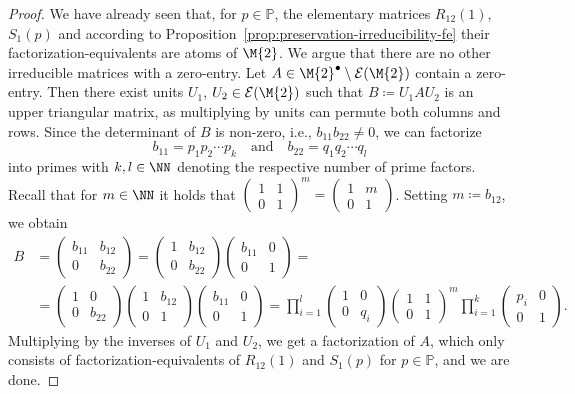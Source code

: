 \begin{proof}
We have already seen that, for $p \in \mathbb{P}$, the elementary matrices $R_{12}(1)$, $S_1(p)$ and according to Proposition~\ref{prop:preservation-irreducibility-fe} their factorization-equivalents are atoms of $\M{2}$. We argue that there are no other irreducible matrices with a zero-entry. Let $A \in {\M{2}}^\bullet\setminus\mathcal{E}(\M{2})$ contain a zero-entry. Then there exist units $U_1$, $U_2 \in \mathcal{E}(\M{2})$ such that $B \coloneqq U_1AU_2$ is an upper triangular matrix, as multiplying by units can permute both columns and rows. Since the determinant of $B$ is non-zero, i.e., $b_{11} b_{22} \neq 0$, we can factorize 
\[ b_{11} = p_1p_2\cdots p_k \quad \text{and} \quad b_{22}=q_1q_2\cdots q_l \]
into primes with $k,l \in \NN$ denoting the respective number of prime factors.  Recall that for $m \in \NN$ it holds that $\begin{pmatrix} 1 & 1 \\ 0 & 1 \end{pmatrix}^m = \begin{pmatrix} 1 & m \\ 0 & 1 \end{pmatrix}$. Setting $m \coloneqq b_{12}$, we obtain
\begin{align*}
B &= \begin{pmatrix} b_{11} & b_{12} \\ 0 & b_{22} \end{pmatrix} = \begin{pmatrix} 1 & b_{12} \\ 0 & b_{22} \end{pmatrix}\begin{pmatrix} b_{11} & 0 \\ 0 & 1 \end{pmatrix} = \\ &=\begin{pmatrix} 1 & 0 \\ 0 & b_{22} \end{pmatrix}\begin{pmatrix} 1 & b_{12} \\ 0 & 1 \end{pmatrix}\begin{pmatrix} b_{11} & 0 \\ 0 & 1 \end{pmatrix} = \prod_{i=1}^l \begin{pmatrix} 1 & 0 \\ 0 & q_i \end{pmatrix} \begin{pmatrix} 1 & 1 \\ 0 & 1 \end{pmatrix}^m \prod_{i=1}^k  \begin{pmatrix} p_i & 0 \\ 0 & 1 \end{pmatrix}.
\end{align*}
Multiplying by the inverses of $U_1$ and $U_2$, we get a factorization of $A$, which only consists of factorization-equivalents of $R_{12}(1)$ and $S_1(p)$ for $p \in \mathbb{P}$, and we are done.
\end{proof}

